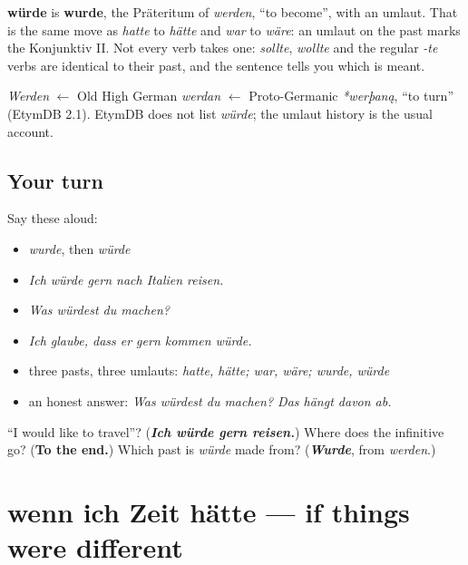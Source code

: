 \begin{cousinweb}
\textbf{würde} is \textbf{wurde}, the Präteritum of \emph{werden}, \textquotedblleft{}to become\textquotedblright{}, with an umlaut. That is the same move as \emph{hatte} to \emph{hätte} and \emph{war} to \emph{wäre}: an umlaut on the past marks the Konjunktiv II. Not every verb takes one: \emph{sollte}, \emph{wollte} and the regular \emph{-te} verbs are identical to their past, and the sentence tells you which is meant.

\emph{Werden} $\leftarrow$ Old High German \emph{werdan} $\leftarrow$ Proto-Germanic \emph{*werþaną}, \textquotedblleft{}to turn\textquotedblright{} (EtymDB 2.1). EtymDB does not list \emph{würde}; the umlaut history is the usual account.
\end{cousinweb}

\subsection*{Your turn}
Say these aloud:

\begin{itemize}
\raggedright
  \item \emph{wurde}, then \emph{würde}
  \item \emph{Ich würde gern nach Italien reisen.}
  \item \emph{Was würdest du machen?}
  \item \emph{Ich glaube, dass er gern kommen würde.}
  \item three pasts, three umlauts: \emph{hatte, hätte; war, wäre; wurde, würde}
  \item an honest answer: \emph{Was würdest du machen? Das hängt davon ab.}
\end{itemize}

\begin{tcolorbox}[breakable,colback=teal!4,colframe=teal!35!black,title={Before you move on}]
\textquotedblleft{}I would like to travel\textquotedblright{}? (\emph{\textbf{Ich würde gern reisen.}}) Where does the infinitive go? (\textbf{To the end.}) Which past is \emph{würde} made from? (\emph{\textbf{Wurde}}, from \emph{werden}.)
\end{tcolorbox}
\section[wenn ich Zeit hätte, würde ich …]{wenn ich Zeit hätte — if things were different}

\label{lesson:GE-C261-wenn-ich-zeit-haette}



